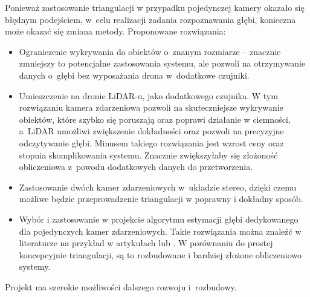 Ponieważ zastosowanie triangulacji w przypadku pojedynczej kamery okazało się błędnym podejściem, w~celu realizacji zadania rozpoznawania głębi, konieczna może okazać się zmiana metody. Proponowane rozwiązania:
\begin{itemize}
    \item Ograniczenie wykrywania do obiektów o~znanym rozmiarze -- znacznie zmniejszy to potencjalne zastosowania systemu, ale pozwoli na otrzymywanie danych o~głębi bez wyposażania drona w~dodatkowe czujniki.
    \item Umieszczenie na dronie LiDAR-u, jako dodatkowego czujnika. W tym rozwiązaniu kamera zdarzeniowa pozwoli na skuteczniejsze wykrywanie obiektów, które szybko się poruszają oraz poprawi działanie w ciemności, a~LiDAR umożliwi zwiększenie dokładności oraz pozwoli na precyzyjne odczytywanie głębi. Minusem takiego rozwiązania jest wzrost ceny oraz stopnia skomplikowania systemu. Znacznie zwiększyłaby się złożoność obliczeniowa z~powodu dodatkowych danych do przetworzenia.
    \item Zastosowanie dwóch kamer zdarzeniowych w~układzie stereo, dzięki czemu możliwe będzie przeprowadzenie triangulacji w poprawny i dokładny sposób.  %
    \item Wybór i zastosowanie w projekcie algorytmu estymacji głębi dedykowanego dla pojedynczych kamer zdarzeniowych. Takie rozwiązania można znaleźć w literaturze na przykład w artykułach \cite{EMVS} lub \cite{single_depth}. W porównaniu do prostej koncepcyjnie triangulacji, są to rozbudowane i bardziej złożone obliczeniowo systemy.
\end{itemize}



\noindent Projekt ma szerokie możliwości dalszego rozwoju i~rozbudowy.

